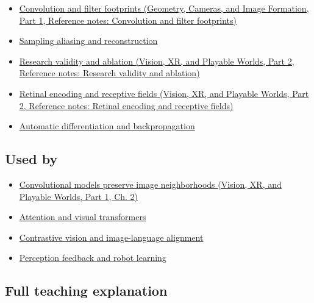 \hypertarget{appendix-47c51ea026fb-prerequisites}{}

\begin{itemize}
\tightlist
\item
  \href{../03-Geometry-Cameras-and-Image-Formation-P01/main.pdf\#nameddest=appendix-d5b3c692d9f0}{Convolution and filter footprints (Geometry, Cameras, and Image Formation, Part 1, Reference notes: Convolution and filter footprints)}
\item
  \hyperref[appendix-6a7869dd79a6]{Sampling aliasing and reconstruction}
\item
  \href{../07-Vision-XR-and-Playable-Worlds-P02/main.pdf\#nameddest=appendix-65788587ef78}{Research validity and ablation (Vision, XR, and Playable Worlds, Part 2, Reference notes: Research validity and ablation)}
\item
  \href{../07-Vision-XR-and-Playable-Worlds-P02/main.pdf\#nameddest=appendix-7281c15ac44a}{Retinal encoding and receptive fields (Vision, XR, and Playable Worlds, Part 2, Reference notes: Retinal encoding and receptive fields)}
\item
  \hyperref[appendix-40df0855b4a7]{Automatic differentiation and backpropagation}
\end{itemize}

\subsection{Used by}\label{appendix-47c51ea026fb-used-by}

\hypertarget{appendix-47c51ea026fb-used-by}{}

\begin{itemize}
\tightlist
\item
  \href{../07-Vision-XR-and-Playable-Worlds-P01/main.pdf\#nameddest=04-visual-computing-ii-ch031-convolutional-models-preserve-image-neighborhoods}{Convolutional models preserve image neighborhoods (Vision, XR, and Playable Worlds, Part 1, Ch. 2)}
\item
  \hyperref[appendix-a9d5dfdd164a]{Attention and visual transformers}
\item
  \hyperref[appendix-772f1fd96148]{Contrastive vision and image-language alignment}
\item
  \hyperref[appendix-b0c42da325f1]{Perception feedback and robot learning}
\end{itemize}

\subsection{Full teaching explanation}\label{appendix-47c51ea026fb-full-teaching-explanation}

